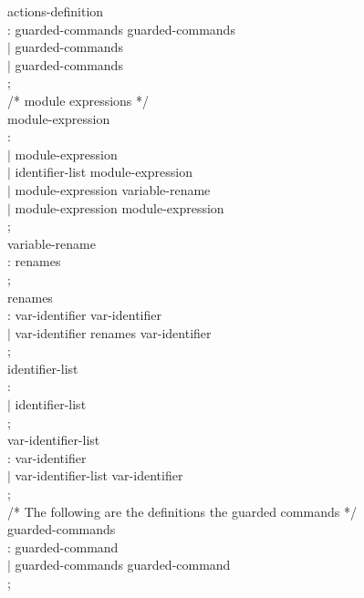 \begin{tab}
\begin{tabbing}
actions-definition \\
\>: \TTINIT guarded-commands \TTUPDATE guarded-commands \\
\>$|$ \TTINIT \TTUPDATE guarded-commands \\
\>$|$ \TTUPDATE guarded-commands \\
\>; \\

/* module expressions */ \\

module-expression \\
\>: \MODULEID \\
\>$|$ \LPARA module-expression \RPARA \\
\>$|$ \TTHIDE identifier-list \TTIN module-expression \ENDHIDE \\
\>$|$ module-expression variable-rename \\
\>$|$ module-expression \PAR module-expression  \\
\>; \\

variable-rename  \\
\>: \LSQBRAC renames \RSQBRAC \\
\>; \\

renames \\
\>: var-identifier \ASSIGN var-identifier \\
\>$|$ var-identifier \COMA renames \COMA var-identifier \\
\>; \\

identifier-list \\
\>: \IDENTIFIER \\
\>$|$ identifier-list \COMA \IDENTIFIER \\
\>; \\

var-identifier-list \\
\>: var-identifier  \\
\>$|$ var-identifier-list \COMA var-identifier \\
\>; \\
  
/* The following are the definitions the guarded commands */ \\

guarded-commands \\
\>: guarded-command \\
\>$|$ guarded-commands guarded-command \\
\>;  \\


\end{tabbing}
\end{tab}

